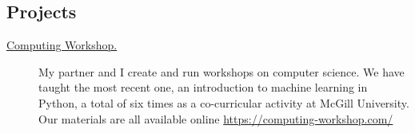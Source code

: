 \documentclass{article}
\begin{document}
\subsection*{Projects}

\begin{description}
  \item[\href{https://computing-workshop.com/}{Computing Workshop.}]
    My partner and I create and run workshops on computer science. We have taught the most recent
    one, an introduction to machine learning in Python, a total of six times as a co-curricular
    activity at McGill University. Our materials are all available online
    \url{https://computing-workshop.com/}


\end{description}
\end{document}
